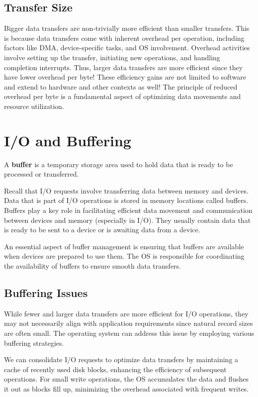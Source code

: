 \documentclass{report}
\newcommand{\definitionBegin}[1]{\begin{tcolorbox}[title={Definition: #1}]}
\newcommand{\definitionEnd}{\end{tcolorbox}}
\begin{document}
\subsection{Transfer Size}
Bigger data transfers are non-trivially more efficient than smaller transfers. This is because data
transfers come with inherent overhead per operation, including factors like DMA, device-specific
tasks, and OS involvement. Overhead activities involve setting up the transfer, initiating new
operations, and handling completion interrupts. Thus, larger data transfers are more efficient since
they have lower overhead per byte! These efficiency gains are not limited to software and extend to
hardware and other contexts as well! The principle of reduced overhead per byte is a fundamental
aspect of optimizing data movements and resource utilization.


\section{I/O and Buffering}
\definitionBegin{Buffer}
A \textbf{buffer} is a temporary storage area used to hold data that is ready to be processed or
transferred.
\definitionEnd

Recall that I/O requests involve transferring data between memory and devices. Data that is part
of I/O operations is stored in memory locations called buffers. Buffers play a key role in
facilitating efficient data movement and communication between devices and memory (especially in
I/O). They usually contain data that is ready to be sent to a device or is awaiting data from a
device.

An essential aspect of buffer management is ensuring that buffers are available when devices are
prepared to use them. The OS is responsible for coordinating the availability of buffers to ensure
smooth data transfers.

\subsection{Buffering Issues}
While fewer and larger data transfers are more efficient for I/O operations, they may not
necessarily align with application requirements since natural record sizes are often small. The
operating system can address this issue by employing various buffering strategies.

We can consolidate I/O requests to optimize data transfers by maintaining a cache of recently used
disk blocks, enhancing the efficiency of subsequent operations. For small write operations, the OS
accumulates the data and flushes it out as blocks fill up, minimizing the overhead associated with
frequent writes.
\end{document}
